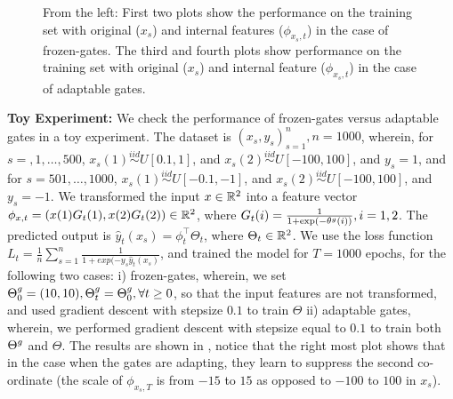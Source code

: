 \begin{figure}[h]
{\begin{tabular}{cccc}
\end{tabular}
}
\caption{From the left: First two plots show the performance on the training set with original ($x_s$) and internal features ($\phi_{x_s,t}$) in the case of frozen-gates. The third and fourth plots show performance on the training set with original ($x_s$) and internal feature ($\phi_{x_s,t}$)  in the case of adaptable gates.}
\label{fig:feat}
\end{figure}

\textbf{Toy Experiment:} We check the performance of frozen-gates versus adaptable gates in a toy experiment. The dataset is $(x_s,y_s)_{s=1}^{n},n=1000$, wherein, for $s=,1,\ldots,500$, $x_s(1)\stackrel{iid}\sim U[0.1,1]$, and $x_s(2)\stackrel{iid}\sim U[-100,100]$, and $y_s=1$, and for $s=501,\ldots,1000$, $x_s(1)\stackrel{iid}\sim U[-0.1,-1]$, and $x_s(2)\stackrel{iid}\sim U[-100,100]$, and $y_s=-1$. We transformed the input $x\in \mathbb{R}^2$ into a feature vector $\phi_{x,t}=(x(1)G_t(1),x(2)G_t(2) )\in \mathbb{R}^2$, where $G_t(i)=\frac{1}{1+\exp(-\theta^g(i))},i=1,2$. The predicted output is $\hat{y}_{t}(x_s)=\phi^\top_t\Theta_t$, where $\Theta_t\in \mathbb{R}^2$. We use the loss function $L_t=\frac{1}{n}\sum_{s=1}^n\frac{1}{1+exp(-y_s\hat{y}_t(x_s)}$, and trained the model for $T=1000$ epochs, for the following two cases: i) frozen-gates, wherein, we set ${\Theta}^g_0=(10,10), {\Theta}^g_t={\Theta}^g_0,\forall t\geq 0$, so that the input features are not transformed, and used gradient descent with stepsize $0.1$ to train $\Theta$ ii) adaptable gates, wherein, we performed gradient descent with stepsize equal to $0.1$ to train both ${\Theta}^g$ and $\Theta$. The results are shown in , notice that the right most plot shows that in the case when the gates are adapting, they learn to suppress the second co-ordinate (the scale of $\phi_{x_s,T}$ is from $-15$ to $15$ as opposed to $-100$ to $100$ in $x_s$). 